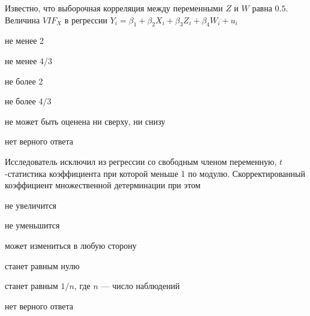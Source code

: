 \begin{question}
Известно, что выборочная корреляция между переменными $Z$ и $W$ равна $0.5$.
Величина $VIF_X$ в регрессии $Y_i = \beta_1 + \beta_2 X_i + \beta_3 Z_i + \beta_4 W_i + u_i$
\begin{answerlist}
  \item не менее 2
  \item не менее 4/3
  \item не более 2
  \item не более 4/3
  \item не может быть оценена ни сверху, ни снизу
  \item нет верного ответа
\end{answerlist}
\end{question}


\begin{question}
Исследователь исключил из регрессии со свободным членом переменную, $t$-статистика коэффициента при которой меньше 1 по модулю. 
Скорректированный коэффициент множественной детерминации при этом 
\begin{answerlist}[2]
  \item не увеличится
  \item не уменьшится
  \item может измениться в любую сторону
  \item станет равным нулю
  \item станет равным $1/n$, где $n$ — число наблюдений
  \item нет верного ответа
\end{answerlist}
\end{question}

